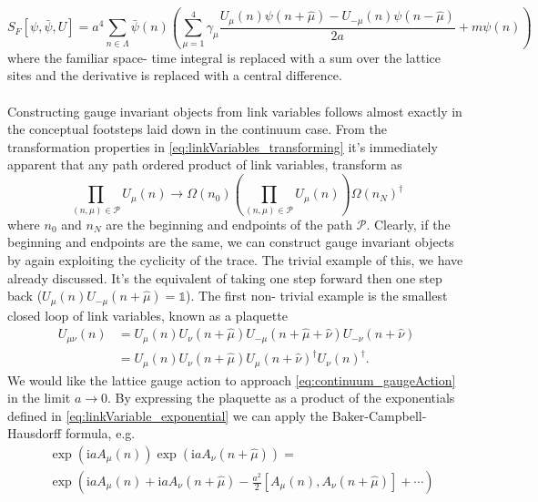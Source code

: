 \documentclass[a4paper,10pt]{book}
\begin{document}
\begin{equation}\label{eq:naiveFermionAction}
S_{F}[\psi, \bar{\psi}, U]=a^{4} \sum_{n \in \Lambda} \bar{\psi}(n)\left(\sum_{\mu=1}^{4} \gamma_{\mu} \frac{U_{\mu}(n) \psi(n+\hat{\mu})-U_{-\mu}(n) \psi(n-\hat{\mu})}{2 a}+m \psi(n)\right)
\end{equation}
where the familiar space- time integral is replaced with a sum over the lattice sites and the derivative is replaced with a central difference.\\\\Constructing gauge invariant objects from link variables follows almost exactly in the conceptual footsteps laid down in the continuum case. From the transformation properties in \eqref{eq:linkVariables_transforming} it's immediately apparent that any path ordered product of link variables, transform as 
\begin{equation}
\prod_{(n, \mu) \in \mathcal{P}} U_{\mu}(n) \rightarrow \Omega(n_0)\left( \prod_{(n, \mu) \in \mathcal{P}} U_{\mu}(n) \right)\Omega(n_N)^\dagger
\end{equation}
where $n_0$ and $n_N$ are the beginning and endpoints of the path $\mathcal{P}$. Clearly, if the beginning and endpoints are the same, we can construct gauge invariant objects by again exploiting the cyclicity of the trace. The trivial example of this, we have already discussed. It's the equivalent of taking one step forward then one step back ($U_{\mu}(n)U_{-\mu}(n+\hat{\mu}) = \mathbb{1}$). The first non- trivial example is the smallest closed loop of link variables, known as a plaquette
\begin{equation}\label{eq:plaquette}
\begin{aligned}
U_{\mu \nu}(n) &=U_{\mu}(n) U_{\nu}(n+\hat{\mu}) U_{-\mu}(n+\hat{\mu}+\hat{\nu}) U_{-\nu}(n+\hat{\nu}) \\
&=U_{\mu}(n) U_{\nu}(n+\hat{\mu}) U_{\mu}(n+\hat{\nu})^{\dagger} U_{\nu}(n)^{\dagger}.
\end{aligned}
\end{equation}
We would like the lattice gauge action to approach \eqref{eq:continuum_gaugeAction} in the limit $a\rightarrow 0$. By expressing the plaquette as a product of the exponentials defined in \eqref{eq:linkVariable_exponential} we can apply the Baker-Campbell-Hausdorff formula, e.g.
\begin{equation}
\begin{aligned}
&\exp \left(\mathrm{i} a A_{\mu}(n)\right)\exp \left(\mathrm{i} a A_{\nu}(n+\hat{\mu})\right) =\\ &\exp \left(\mathrm{i} a A_{\mu}(n)+\mathrm{i} a A_{\nu}(n+\hat{\mu})-\frac{a^{2}}{2}\left[A_{\mu}(n), A_{\nu}(n+\hat{\mu})\right]+\cdots\right) 
\end{aligned}
\end{equation}
\end{document}
